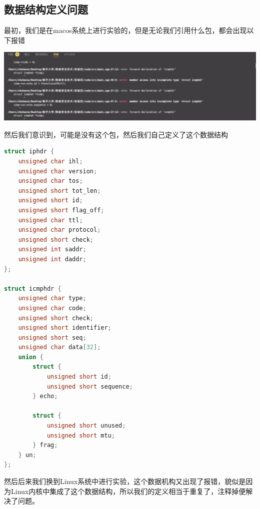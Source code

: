 \documentclass[UTF8,a4paper,10pt]{ctexart}
\begin{document}
\subsection{数据结构定义问题}
最初，我们是在macos系统上进行实验的，但是无论我们引用什么包，都会出现以下报错
\begin{center}
    \includegraphics[scale= 0.3]{img/2}
\end{center}
然后我们意识到，可能是没有这个包，然后我们自己定义了这个数据结构
\begin{lstlisting}[language = C++]
struct iphdr {
    unsigned char ihl;
	unsigned char version;
	unsigned char tos;
	unsigned short tot_len;
	unsigned short id;
	unsigned short flag_off;
	unsigned char ttl;
	unsigned char protocol;
	unsigned short check;
	unsigned int saddr;
	unsigned int daddr;
};

struct icmphdr {
	unsigned char type;
	unsigned char code;
	unsigned short check;
	unsigned short identifier;
	unsigned short seq;
	unsigned char data[32];
    union {
        struct {
            unsigned short id;
            unsigned short sequence;
        } echo;

        struct {
            unsigned short unused;
            unsigned short mtu;
        } frag;
    } un;
};
\end{lstlisting}
然后后来我们换到Linux系统中进行实验，这个数据机构又出现了报错，貌似是因为Linux内核中集成了这个数据结构，所以我们的定义相当于重复了，注释掉便解决了问题。
\end{document}
